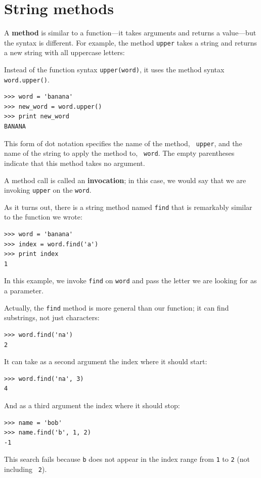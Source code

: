 \documentclass[10pt]{book}
\begin{document}
\section{String methods}

A {\bf method} is similar to a function---it takes arguments and
returns a value---but the syntax is different.  For example, the
method {\tt upper} takes a string and returns a new string with
all uppercase letters:

Instead of the function syntax {\tt upper(word)}, it uses
the method syntax {\tt word.upper()}.

\begin{verbatim}
>>> word = 'banana'
>>> new_word = word.upper()
>>> print new_word
BANANA
\end{verbatim}
%
This form of dot notation specifies the name of the method, {\tt
upper}, and the name of the string to apply the method to, {\tt
word}.  The empty parentheses indicate that this method takes no
argument.

A method call is called an {\bf invocation}; in this case, we would
say that we are invoking {\tt upper} on the {\tt word}.

As it turns out, there is a string method named {\tt find} that
is remarkably similar to the function we wrote:

\begin{verbatim}
>>> word = 'banana'
>>> index = word.find('a')
>>> print index
1
\end{verbatim}
%
In this example, we invoke {\tt find} on {\tt word} and pass
the letter we are looking for as a parameter.

Actually, the {\tt find} method is more general than our function;
it can find substrings, not just characters:

\begin{verbatim}
>>> word.find('na')
2
\end{verbatim}
%
It can take as a second argument the index where it should start:

\begin{verbatim}
>>> word.find('na', 3)
4
\end{verbatim}
%
And as a third argument the index where it should stop:

\begin{verbatim}
>>> name = 'bob'
>>> name.find('b', 1, 2)
-1
\end{verbatim}
%
This search fails because {\tt b} does not
appear in the index range from {\tt 1} to {\tt 2} (not including {\tt
2}).
\end{document}
